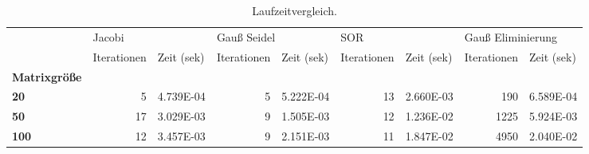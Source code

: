 \begin{table}[h!]
\centering
\caption{Laufzeitvergleich.}
\label{laufzeit}
\begin{tabular}{lrlrlrlrl}
\toprule
{} & \multicolumn{2}{l}{Jacobi} & \multicolumn{2}{l}{Gauß Seidel} & \multicolumn{2}{l}{SOR} & \multicolumn{2}{l}{Gauß Eliminierung} \\
{} & Iterationen & Zeit (sek) & Iterationen & Zeit (sek) & Iterationen & Zeit (sek) &       Iterationen & Zeit (sek) \\
\textbf{Matrixgröße} &             &            &             &            &             &            &                   &            \\
\midrule
\textbf{20         } &           5 &  4.739E-04 &           5 &  5.222E-04 &          13 &  2.660E-03 &               190 &  6.589E-04 \\
\textbf{50         } &          17 &  3.029E-03 &           9 &  1.505E-03 &          12 &  1.236E-02 &              1225 &  5.924E-03 \\
\textbf{100        } &          12 &  3.457E-03 &           9 &  2.151E-03 &          11 &  1.847E-02 &              4950 &  2.040E-02 \\
\bottomrule
\end{tabular}
\end{table}

